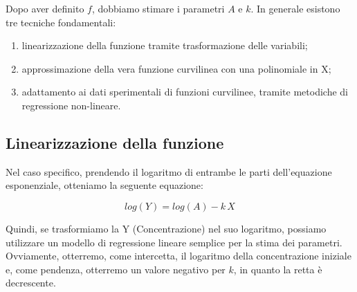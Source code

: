 \documentclass[a4paper,12pt,oneside]{book}
\providecommand{\tightlist}{%
  \setlength{\itemsep}{0pt}\setlength{\parskip}{0pt}}
\begin{document}
Dopo aver definito \(f\), dobbiamo stimare i parametri \(A\) e \(k\). In generale esistono tre tecniche fondamentali:

\begin{enumerate}
\def\labelenumi{\arabic{enumi}.}
\tightlist
\item
  linearizzazione della funzione tramite trasformazione delle variabili;
\item
  approssimazione della vera funzione curvilinea con una polinomiale in X;
\item
  adattamento ai dati sperimentali di funzioni curvilinee, tramite metodiche di regressione non-lineare.
\end{enumerate}

\hypertarget{linearizzazione-della-funzione}{%
\subsection{Linearizzazione della funzione}\label{linearizzazione-della-funzione}}

Nel caso specifico, prendendo il logaritmo di entrambe le parti dell'equazione esponenziale, otteniamo la seguente equazione:

\[ log(Y) = log(A) - k \, X \]

Quindi, se trasformiamo la Y (Concentrazione) nel suo logaritmo, possiamo utilizzare un modello di regressione lineare semplice per la stima dei parametri. Ovviamente, otterremo, come intercetta, il logaritmo della concentrazione iniziale e, come pendenza, otterremo un valore negativo per \(k\), in quanto la retta è decrescente.
\end{document}
